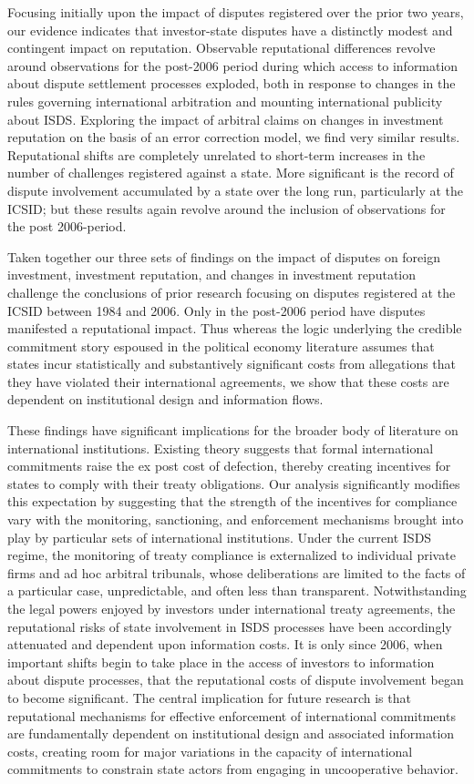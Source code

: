 \documentclass[12pt,onesided]{amsart}
\begin{document}
Focusing initially upon the impact of disputes registered over the prior two years, our evidence indicates that investor-state disputes have a distinctly modest and contingent impact on reputation. Observable reputational differences revolve around observations for the post-2006 period during which access to information about dispute settlement processes exploded, both in response to changes in the rules governing international arbitration and mounting international publicity about ISDS. Exploring the impact of arbitral claims on changes in investment reputation on the basis of an error correction model, we find very similar results. Reputational shifts are completely unrelated to short-term increases in the number of challenges registered against a state. More significant is the record of dispute involvement accumulated by a state over the long run, particularly at the ICSID; but these results again revolve around the inclusion of observations for the post 2006-period.

Taken together our three sets of findings on the impact of disputes on foreign investment, investment reputation, and changes in investment reputation challenge the conclusions of prior research focusing on disputes registered at the ICSID between 1984 and 2006. Only in the post-2006 period have disputes manifested a reputational impact. Thus whereas the logic underlying the credible commitment story espoused in the political economy literature assumes that states incur statistically and substantively significant costs from allegations that they have violated their international agreements, we show that these costs are dependent on institutional design and information flows.

These findings have significant implications for the broader body of literature on international institutions. Existing theory suggests that formal international commitments raise the ex post cost of defection, thereby creating incentives for states to comply with their treaty obligations. Our analysis significantly modifies this expectation by suggesting that the strength of the incentives for compliance vary with the monitoring, sanctioning, and enforcement mechanisms brought into play by particular sets of international institutions. Under the current ISDS regime, the monitoring of treaty compliance is externalized to individual private firms and ad hoc arbitral tribunals, whose deliberations are limited to the facts of a particular case, unpredictable, and often less than transparent. Notwithstanding the legal powers enjoyed by investors under international treaty agreements, the reputational risks of state involvement in ISDS processes have been accordingly attenuated and dependent upon information costs. It is only since 2006, when important shifts begin to take place in the access of investors to information about dispute processes, that the reputational costs of dispute involvement began to become significant. The central implication for future research is that reputational mechanisms for effective enforcement of international commitments are fundamentally dependent on institutional design and associated information costs, creating room for major variations in the capacity of international commitments to constrain state actors from engaging in uncooperative behavior.
\end{document}
